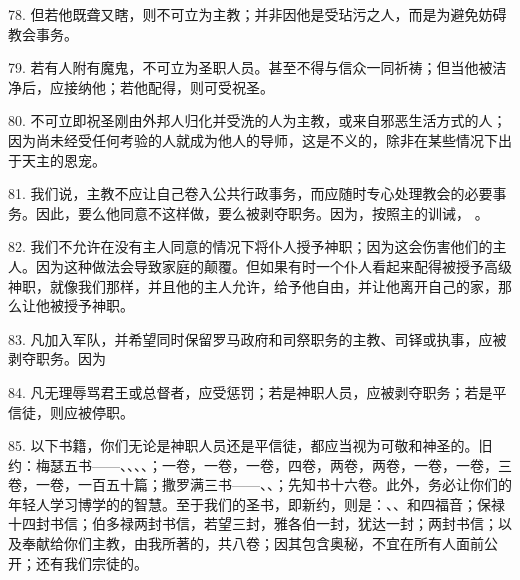 78. 但若他既聋又瞎，则不可立为主教；并非因他是受玷污之人，而是为避免妨碍教会事务。\par

79. 若有人附有魔鬼，不可立为圣职人员。甚至不得与信众一同祈祷；但当他被洁净后，应接纳他；若他配得，则可受祝圣。\par

80. 不可立即祝圣刚由外邦人归化并受洗的人为主教，或来自邪恶生活方式的人；因为尚未经受任何考验的人就成为他人的导师，这是不义的，除非在某些情况下出于天主的恩宠。\par

81. 我们说，主教不应让自己卷入公共行政事务，而应随时专心处理教会的必要事务。因此，要么他同意不这样做，要么被剥夺职务。因为，按照主的训诫， 。\par

82. 我们不允许在没有主人同意的情况下将仆人授予神职；因为这会伤害他们的主人。因为这种做法会导致家庭的颠覆。但如果有时一个仆人看起来配得被授予高级神职，就像我们那样，并且他的主人允许，给予他自由，并让他离开自己的家，那么让他被授予神职。\par

83. 凡加入军队，并希望同时保留罗马政府和司祭职务的主教、司铎或执事，应被剥夺职务。因为\par

84. 凡无理辱骂君王或总督者，应受惩罚；若是神职人员，应被剥夺职务；若是平信徒，则应被停职。\par

85. 以下书籍，你们无论是神职人员还是平信徒，都应当视为可敬和神圣的。旧约：梅瑟五书——、、、、；一卷，一卷，一卷，四卷，两卷，两卷，一卷，一卷，三卷，一卷，一百五十篇；撒罗满三书——、、；先知书十六卷。此外，务必让你们的年轻人学习博学的的智慧。至于我们的圣书，即新约，则是：、、和四福音；保禄十四封书信；伯多禄两封书信，若望三封，雅各伯一封，犹达一封；两封书信；以及奉献给你们主教，由我所著的，共八卷；因其包含奥秘，不宜在所有人面前公开；还有我们宗徒的。\par

